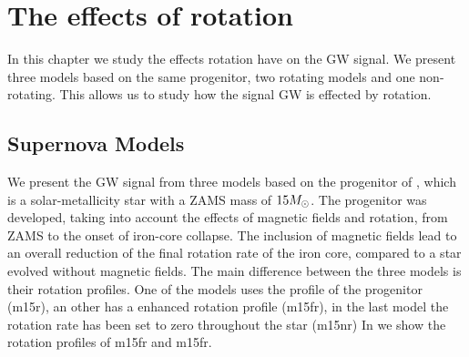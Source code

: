 
\chapter{The effects of rotation}
In this chapter we study the effects rotation have on the GW signal. 
We present three models based on the same progenitor, two rotating models and one non-rotating.
This allows us to study how the signal GW is effected by rotation. 


\section{Supernova Models}
We present the GW signal from three models based on the progenitor of
\cite{heger_05}, which is a solar-metallicity star with a ZAMS mass of $15 {M_\odot}$.
The progenitor was developed, taking into account the effects of magnetic fields and rotation,
from ZAMS to the onset of iron-core collapse. The inclusion of magnetic fields lead to an overall
reduction of the final rotation rate of the iron core, compared to a star evolved without magnetic
fields. The main difference between the three models is their rotation profiles. One of the models
uses the profile of the progenitor (m15r), an other has a enhanced rotation profile (m15fr),
in the last model the rotation rate has been set to zero throughout the star (m15nr)
In  we show the rotation profiles of m15fr and m15fr.
